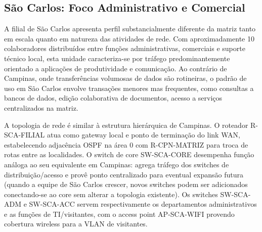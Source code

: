 \documentclass[12pt,a4paper]{article}
\begin{document}
\subsection{São Carlos: Foco Administrativo e Comercial}

A filial de São Carlos apresenta perfil substancialmente diferente da matriz tanto em escala quanto em natureza das atividades de rede. Com aproximadamente 10 colaboradores distribuídos entre funções administrativas, comerciais e suporte técnico local, esta unidade caracteriza-se por tráfego predominantemente orientado a aplicações de produtividade e comunicação. Ao contrário de Campinas, onde transferências volumosas de dados são rotineiras, o padrão de uso em São Carlos envolve transações menores mas frequentes, como consultas a bancos de dados, edição colaborativa de documentos, acesso a serviços centralizados na matriz.

A topologia de rede é similar à estrutura hierárquica de Campinas. O roteador R-SCA-FILIAL atua como gateway local e ponto de terminação do link WAN, estabelecendo adjacência OSPF na área 0 com R-CPN-MATRIZ para troca de rotas entre as localidades. O switch de core SW-SCA-CORE desempenha função análoga ao seu equivalente em Campinas: agrega tráfego dos switches de distribuição/acesso e provê ponto centralizado para eventual expansão futura (quando a equipe de São Carlos crescer, novos switches podem ser adicionados conectando-se ao core sem alterar a topologia existente). Os switches SW-SCA-ADM e SW-SCA-ACC servem respectivamente os departamentos administrativos e as funções de TI/visitantes, com o access point AP-SCA-WIFI provendo cobertura wireless para a VLAN de visitantes.
\end{document}
